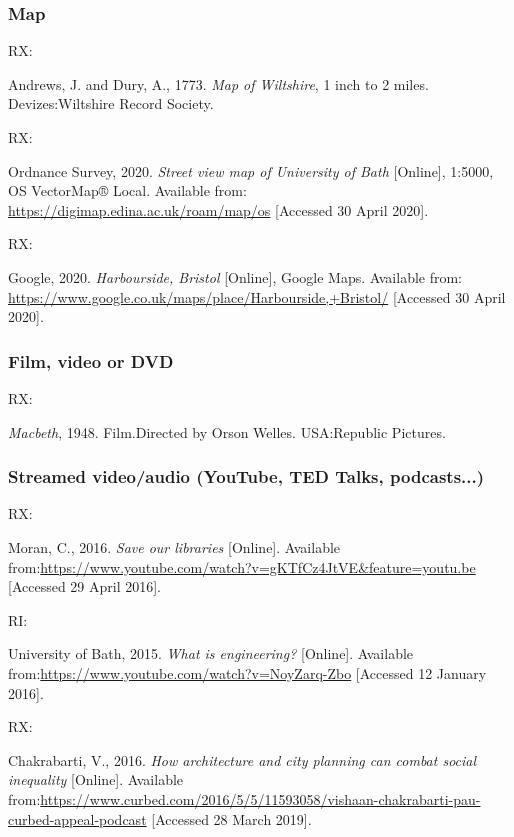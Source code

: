 \subsubsection*{Map}

RX: \cite{andrews.dury1773wilts}

Andrews, J. and Dury, A., 1773. \emph{Map of Wiltshire}, 1 inch to 2 miles. Devizes:\@ Wiltshire Record Society.


RX: \cite{os2020bath}

Ordnance Survey, 2020. \emph{Street view map of University of Bath} [Online], 1:5000, OS VectorMap® Local. Available from: \url{https://digimap.edina.ac.uk/roam/map/os} [Accessed 30 April 2020].


RX: \cite{google2020harbourside}

Google, 2020. \emph{Harbourside, Bristol} [Online], Google Maps. Available from: \url{https://www.google.co.uk/maps/place/Harbourside,+Bristol/} [Accessed 30 April 2020].



\subsubsection*{Film, video or DVD}

RX: \cite{macbeth1948}

\emph{Macbeth}, 1948. Film.\@ Directed by Orson Welles. USA:\@ Republic Pictures.



\subsubsection*{Streamed video/audio (YouTube, TED Talks, podcasts...)}

RX: \cite{moran2016sol}

Moran, C., 2016. \emph{Save our libraries} [Online]. Available from:\@ \url{https://www.youtube.com/watch?v=gKTfCz4JtVE&feature=youtu.be} [Accessed 29 April 2016].


RI: \cite{uob2015wie}

University of Bath, 2015. \emph{What is engineering?} [Online]. Available from:\@ \url{https://www.youtube.com/watch?v=NoyZarq-Zbo} [Accessed 12 January 2016].


RX: \cite{chakrabarti2016hac}

Chakrabarti, V., 2016. \emph{How architecture and city planning can combat social inequality} [Online]. Available from:\@ \url{https://www.curbed.com/2016/5/5/11593058/vishaan-chakrabarti-pau-curbed-appeal-podcast} [Accessed 28 March 2019].



